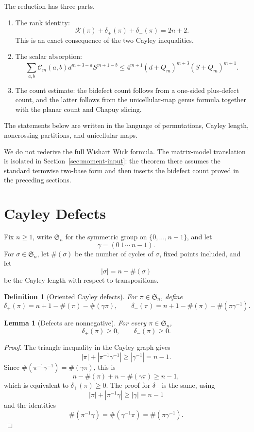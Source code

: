 \documentclass[11pt]{article}
\numberwithin{equation}{section}
\newtheorem{lemma}[theorem]{Lemma}
\newtheorem{definition}[theorem]{Definition}
\newcommand{\Sym}{\mathfrak S}
\newcommand{\cyc}{\#}
\newcommand{\g}{\gamma}
\newcommand{\ddp}{\delta_{+}}
\newcommand{\ddm}{\delta_{-}}
\newcommand{\rank}{\mathcal R}
\newcommand{\Count}{\mathcal C}
\newcommand{\Loss}{Q}
\begin{document}
The reduction has three parts.

\begin{enumerate}[label=(\roman*),leftmargin=*]
  \item The rank identity:
  \[
    \rank(\pi)+\ddp(\pi)+\ddm(\pi)=2n+2.
  \]
  This is an exact consequence of the two Cayley inequalities.
  \item The scalar absorption:
  \[
    \sum_{a,b}\Count_m(a,b)d^{m+3-a}S^{m+1-b}
    \le
    4^{m+1}(d+\Loss_m)^{m+3}(S+\Loss_m)^{m+1}.
  \]
  \item The count estimate: the bidefect count follows from a one-sided
  plus-defect count, and the latter follows from the unicellular-map genus
  formula together with the planar count and Chapuy slicing.
\end{enumerate}

The statements below are written in the language of permutations, Cayley
length, noncrossing partitions, and unicellular maps.

We do not rederive the full Wishart Wick formula.  The matrix-model
translation is isolated in Section~\ref{sec:moment-input}: the theorem there
assumes the standard termwise two-base form and then inserts the bidefect
count proved in the preceding sections.

\section{Cayley Defects}

Fix \(n\ge1\), write \(\Sym_n\) for the symmetric group on
\(\{0,\ldots,n-1\}\), and let
\[
  \g=(0\,1\,\cdots\,n-1).
\]
For \(\sigma\in\Sym_n\), let \(\cyc(\sigma)\) be the number of cycles of
\(\sigma\), fixed points included, and let
\[
  |\sigma|=n-\cyc(\sigma)
\]
be the Cayley length with respect to transpositions.

\begin{definition}[Oriented Cayley defects]
For \(\pi\in\Sym_n\), define
\[
  \ddp(\pi)=n+1-\cyc(\pi)-\cyc(\g\pi),
  \qquad
  \ddm(\pi)=n+1-\cyc(\pi)-\cyc(\pi\g^{-1}).
\]
\end{definition}

\begin{lemma}[Defects are nonnegative]\label{lem:defects-nonnegative}
For every \(\pi\in\Sym_n\),
\[
  \ddp(\pi)\ge0,
  \qquad
  \ddm(\pi)\ge0.
\]
\end{lemma}

\begin{proof}
The triangle inequality in the Cayley graph gives
\[
  |\pi|+|\pi^{-1}\g^{-1}|\ge |\g^{-1}|=n-1.
\]
Since \(\cyc(\pi^{-1}\g^{-1})=\cyc(\g\pi)\), this is
\[
  n-\cyc(\pi)+n-\cyc(\g\pi)\ge n-1,
\]
which is equivalent to \(\ddp(\pi)\ge0\).  The proof for \(\ddm\) is the
same, using
\[
  |\pi|+|\pi^{-1}\g|\ge |\g|=n-1
\]
and the identities
\[
  \cyc(\pi^{-1}\g)=\cyc(\g^{-1}\pi)=\cyc(\pi\g^{-1}).
\]
\end{proof}
\end{document}
